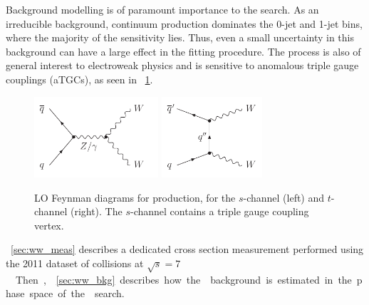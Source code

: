 
Background modelling is of paramount importance to the \HWW search. As an irreducible 
background, continuum \WWlvlv production dominates the 0-jet and 1-jet bins, where the 
majority of the sensitivity lies. Thus, even a small uncertainty in this background can 
have a large effect in the fitting procedure. The process is also of general interest to 
electroweak physics and is sensitive to anomalous triple gauge couplings (aTGCs), as seen 
in \Figure~\ref{fig:WW:feyn}.

\begin{figure}[b]
	\null\hfill
	\includegraphics[height=3cm]{axodraw/WW_schannel.pdf}
	\hfill
	\includegraphics[height=3cm]{axodraw/WW_tchannel.pdf}
	\hfill\null
	\caption{LO Feynman diagrams for \HepProcess{\qqbar \HepTo \WW} production, for the 
	$s$-channel (left) and $t$-channel (right). The $s$-channel contains a triple gauge 
	coupling vertex.}
	\label{fig:WW:feyn}
\end{figure}

\Section~\ref{sec:ww_meas} describes a dedicated \WW cross section measurement performed 
using the 2011 dataset of \pp collisions at \unit{$\sqrt{s} = 7$}{\TeV}. Then, 
\Section~\ref{sec:ww_bkg} describes how the \WW background is estimated in the phase space 
of the \HWW search.

